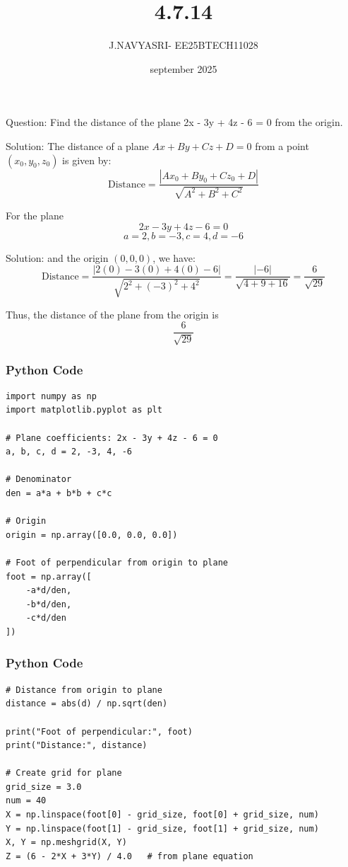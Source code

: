 \documentclass{beamer}
\title %
{4.7.14}
\date{september 2025}
\author %
{J.NAVYASRI- EE25BTECH11028}
\begin{document}
\frame{\titlepage}
\begin{frame}{Question:}
Find the distance of the plane 
2x - 3y + 4z - 6 = 0
from the origin.
\end{frame}

\begin{frame}{Solution:}
 The distance of a plane $Ax + By + Cz + D = 0$ from a point $(x_0, y_0, z_0)$ is given by:
\begin{equation}
\text{Distance} = \frac{|A x_0 + B y_0 + C z_0 + D|}{\sqrt{A^2 + B^2 + C^2}}
\end{equation}

For the plane 
\begin{equation}
2x - 3y + 4z - 6 = 0
\end{equation} 
\[a = 2 , b = -3, c =4 , d = -6
\]
\end{frame}
\begin{frame}{Solution:}
and the origin $(0,0,0)$, we have:
\begin{equation}
\text{Distance} = \frac{|2(0) - 3(0) + 4(0) - 6|}{\sqrt{2^2 + (-3)^2 + 4^2}}
= \frac{|-6|}{\sqrt{4 + 9 + 16}}
= \frac{6}{\sqrt{29}}
\end{equation}


Thus, the distance of the plane from the origin is 
\begin{equation}
\boxed{\frac{6}{\sqrt{29}}}
\end{equation}
\end{frame}


\begin{frame}[fragile]
    \frametitle{Python Code}
    \begin{lstlisting}
import numpy as np
import matplotlib.pyplot as plt

# Plane coefficients: 2x - 3y + 4z - 6 = 0
a, b, c, d = 2, -3, 4, -6

# Denominator
den = a*a + b*b + c*c

# Origin
origin = np.array([0.0, 0.0, 0.0])

# Foot of perpendicular from origin to plane
foot = np.array([
    -a*d/den,
    -b*d/den,
    -c*d/den
])
\end{lstlisting}
\end{frame}


\begin{frame}[fragile]
    \frametitle{Python Code}
    \begin{lstlisting}
# Distance from origin to plane
distance = abs(d) / np.sqrt(den)

print("Foot of perpendicular:", foot)
print("Distance:", distance)

# Create grid for plane
grid_size = 3.0
num = 40
X = np.linspace(foot[0] - grid_size, foot[0] + grid_size, num)
Y = np.linspace(foot[1] - grid_size, foot[1] + grid_size, num)
X, Y = np.meshgrid(X, Y)
Z = (6 - 2*X + 3*Y) / 4.0   # from plane equation
\end{lstlisting}
\end{frame}
\end{document}

